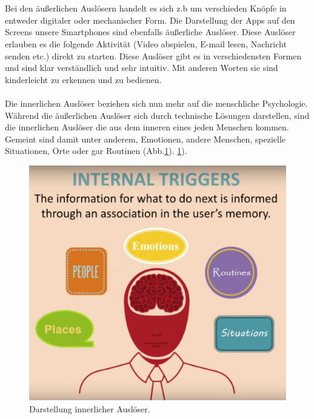 \documentclass[a4paper,12pt]{scrartcl}
\begin{document}
\\\\
Bei den äußerlichen Auslösern handelt es sich z.b um verschieden Knöpfe in entweder digitaler oder mechanischer Form. Die Darstellung der Apps auf den Screens unsere Smartphones sind ebenfalls äußerliche Auslöser. Diese Auslöser erlauben es die folgende Aktivität (Video abspielen, E-mail lesen, Nachricht senden etc.) direkt zu starten. Diese Auslöser gibt es in verschiedensten Formen und sind klar verständlich und sehr intuitiv. Mit anderen Worten sie sind kinderleicht zu erkennen und zu bedienen\cite{Eyal2014}.
\\\\
Die innerlichen Auslöser beziehen sich nun mehr auf die menschliche Psychologie. Während die äußerlichen Auslöser sich durch technische Lösungen darstellen, sind die innerlichen Auslöser die aus dem inneren eines jeden Menschen kommen. Gemeint sind damit unter anderem, Emotionen, andere Menschen, spezielle Situationen, Orte oder gar Routinen (Abb.\ref{internalTriggerBild}). 
\ref{internalTriggerBild}).
\begin{figure}[h!]
\begin{center}
\includegraphics[scale = 0.3]{Bilder/internalTrigger.eps}
\caption{Darstellung innerlicher Auslöser\cite{ExternalTrigger2018}.}
\label{internalTriggerBild}
\end{center}
\end{figure} 
\\\\
\end{document}
